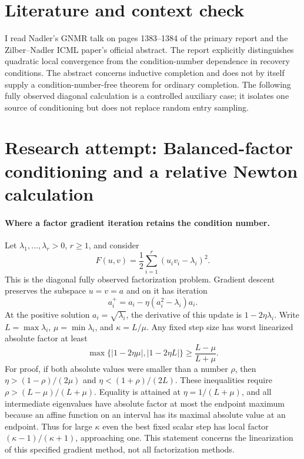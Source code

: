 \documentclass[11pt]{article}
\begin{document}
\section{Literature and context check}

I read Nadler's GNMR talk on pages 1383--1384 of the primary report and the
Zilber--Nadler ICML paper's official abstract. The report explicitly distinguishes
quadratic local convergence from the condition-number dependence in recovery
conditions. The abstract concerns inductive completion and does not by itself
supply a condition-number-free theorem for ordinary completion. The following
fully observed diagonal calculation is a controlled auxiliary case; it isolates
one source of conditioning but does not replace random entry sampling.

\section{Research attempt: Balanced-factor conditioning and a relative Newton calculation}

\paragraph{Where a factor gradient iteration retains the condition number.}
Let $\lambda_1,\ldots,\lambda_r>0$, $r\geq1$, and consider
\[
 F(u,v)=\frac12\sum_{i=1}^r(u_iv_i-\lambda_i)^2.
\]
This is the diagonal fully observed factorization problem.
Gradient descent preserves the subspace $u=v=a$ and on it has iteration
\[
 a_i^+=a_i-\eta(a_i^2-\lambda_i)a_i.
\]
At the positive solution $a_i=\sqrt{\lambda_i}$, the derivative of this update
is $1-2\eta\lambda_i$. Write $L=\max\lambda_i$, $\mu=\min\lambda_i$,
and $\kappa=L/\mu$. Any fixed step size has worst linearized absolute factor
at least
\[
 \max\{|1-2\eta\mu|,|1-2\eta L|\}
 \geq \frac{L-\mu}{L+\mu}.
\]
For proof, if both absolute values were smaller than a number $\rho$, then
$\eta>(1-\rho)/(2\mu)$ and $\eta<(1+\rho)/(2L)$.
These inequalities require $\rho>(L-\mu)/(L+\mu)$.
Equality is attained at $\eta=1/(L+\mu)$, and all intermediate eigenvalues
have absolute factor at most the endpoint maximum because an affine function
on an interval has its maximal absolute value at an endpoint.
Thus for large $\kappa$ even the best fixed scalar step has local factor
$(\kappa-1)/(\kappa+1)$, approaching one. This statement concerns the
linearization of this specified gradient method, not all factorization methods.
\end{document}
